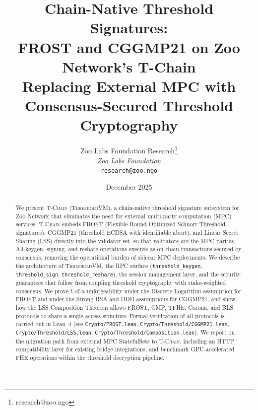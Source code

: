 \documentclass[11pt,letterpaper]{article}
\title{\textbf{Chain-Native Threshold Signatures:\\FROST and CGGMP21 on Zoo Network's T-Chain}\\
\large Replacing External MPC with Consensus-Secured Threshold Cryptography}
\author{
Zoo Labs Foundation Research\thanks{research@zoo.ngo}\\
\textit{Zoo Labs Foundation}\\
\texttt{research@zoo.ngo}
}
\date{December 2025}
\theoremstyle{definition}
\theoremstyle{remark}
\newcommand{\TChain}{\textsc{T-Chain}}
\newcommand{\ThresholdVM}{\textsc{ThresholdVM}}
\newcommand{\FROST}{\textsc{FROST}}
\newcommand{\CGGMP}{\textsc{CGGMP21}}
\newcommand{\LSS}{\textsc{LSS}}
\begin{document}
\zoocoverpage

\begin{abstract}
We present \TChain{} (\ThresholdVM{}), a chain-native threshold signature subsystem for Zoo Network that eliminates the need for external multi-party computation (MPC) services. \TChain{} embeds \FROST{} (Flexible Round-Optimized Schnorr Threshold signatures), \CGGMP{} (threshold ECDSA with identifiable abort), and Linear Secret Sharing (\LSS{}) directly into the validator set, so that validators \emph{are} the MPC parties. All keygen, signing, and reshare operations execute as on-chain transactions secured by consensus, removing the operational burden of sidecar MPC deployments. We describe the architecture of \ThresholdVM{}, the RPC surface (\texttt{threshold\_keygen}, \texttt{threshold\_sign}, \texttt{threshold\_reshare}), the session management layer, and the security guarantees that follow from coupling threshold cryptography with stake-weighted consensus. We prove $t$-of-$n$ unforgeability under the Discrete Logarithm assumption for \FROST{} and under the Strong RSA and DDH assumptions for \CGGMP{}, and show how the \LSS{} Composition Theorem allows \FROST{}, CMP, TFHE, Corona, and BLS protocols to share a single access structure. Formal verification of all protocols is carried out in Lean~4 (see \texttt{Crypto/FROST.lean}, \texttt{Crypto/Threshold/CGGMP21.lean}, \texttt{Crypto/Threshold/LSS.lean}, \texttt{Crypto/Threshold/Composition.lean}). We report on the migration path from external MPC StatefulSets to \TChain{}, including an HTTP compatibility layer for existing bridge integrations, and benchmark GPU-accelerated FHE operations within the threshold decryption pipeline.
\end{abstract}

\tableofcontents
\newpage














\end{document}

